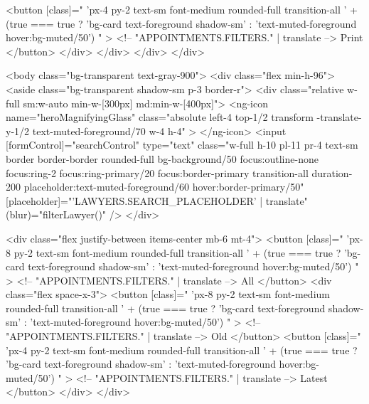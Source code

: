           <button
            [class]="
              'px-4 py-2 text-sm font-medium rounded-full transition-all ' +
              (true === true
                ? 'bg-card text-foreground shadow-sm'
                : 'text-muted-foreground hover:bg-muted/50')
            "
          >
            <!-- {{ "APPOINTMENTS.FILTERS." | translate }} -->
            Print
          </button>
        </div>
      </div>
    </div>
  </div>

  <body class="bg-transparent text-gray-900">
    <div class="flex min-h-96">
      <aside class="bg-transparent shadow-sm p-3 border-r">
        <div class="relative w-full sm:w-auto min-w-[300px] md:min-w-[400px]">
          <ng-icon
            name="heroMagnifyingGlass"
            class="absolute left-4 top-1/2 transform -translate-y-1/2 text-muted-foreground/70 w-4 h-4"
          >
          </ng-icon>
          <input
            [formControl]="searchControl"
            type="text"
            class="w-full h-10 pl-11 pr-4 text-sm border border-border rounded-full bg-background/50 focus:outline-none focus:ring-2 focus:ring-primary/20 focus:border-primary transition-all duration-200 placeholder:text-muted-foreground/60 hover:border-primary/50"
            [placeholder]="'LAWYERS.SEARCH_PLACEHOLDER' | translate"
            (blur)="filterLawyer()"
          />
        </div>

        <div class="flex justify-between items-center mb-6 mt-4">
          <button
            [class]="
              'px-8 py-2 text-sm font-medium rounded-full transition-all ' +
              (true === true
                ? 'bg-card text-foreground shadow-sm'
                : 'text-muted-foreground hover:bg-muted/50')
            "
          >
            <!-- {{ "APPOINTMENTS.FILTERS." | translate }} -->
            All
          </button>
          <div class="flex space-x-3">
            <button
              [class]="
                'px-8 py-2 text-sm font-medium rounded-full transition-all ' +
                (true === true
                  ? 'bg-card text-foreground shadow-sm'
                  : 'text-muted-foreground hover:bg-muted/50')
              "
            >
              <!-- {{ "APPOINTMENTS.FILTERS." | translate }} -->
              Old
            </button>
            <button
              [class]="
                'px-4 py-2 text-sm font-medium rounded-full transition-all ' +
                (true === true
                  ? 'bg-card text-foreground shadow-sm'
                  : 'text-muted-foreground hover:bg-muted/50')
              "
            >
              <!-- {{ "APPOINTMENTS.FILTERS." | translate }} -->
              Latest
            </button>
          </div>
        </div>

